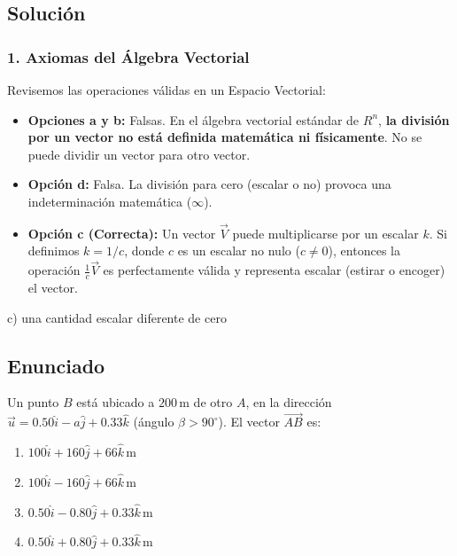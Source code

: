 \documentclass[12pt, a4paper]{article}
\begin{document}
\subsection*{Solución}

\subsubsection*{1. Axiomas del Álgebra Vectorial}
Revisemos las operaciones válidas en un Espacio Vectorial:
\begin{itemize}
    \item \textbf{Opciones a y b:} Falsas. En el álgebra vectorial estándar de $R^n$, \textbf{la división por un vector no está definida matemática ni físicamente}. No se puede dividir un vector para otro vector.
    \item \textbf{Opción d:} Falsa. La división para cero (escalar o no) provoca una indeterminación matemática ($\infty$).
    \item \textbf{Opción c (Correcta):} Un vector $\vec{V}$ puede multiplicarse por un escalar $k$. Si definimos $k = 1/c$, donde $c$ es un escalar no nulo ($c \neq 0$), entonces la operación $\frac{1}{c} \vec{V}$ es perfectamente válida y representa escalar (estirar o encoger) el vector.
\end{itemize}

\begin{tcolorbox}[colback=green!5!white, colframe=green!50!black, title=Respuesta Final]
\centering \Large c) una cantidad escalar diferente de cero
\end{tcolorbox}

\newpage


\subsection*{Enunciado}
Un punto $B$ está ubicado a $200 \, \text{m}$ de otro $A$, en la dirección $\vec{u} = 0.50 \hat{i} - a \hat{j} + 0.33 \hat{k}$ (ángulo $\beta > 90^\circ$). El vector $\vec{AB}$ es:
\begin{enumerate}[label=\alph*)]
    \item $100 \hat{i} + 160 \hat{j} + 66 \hat{k} \, \text{m}$
    \item $100 \hat{i} - 160 \hat{j} + 66 \hat{k} \, \text{m}$
    \item $0.50 \hat{i} - 0.80 \hat{j} + 0.33 \hat{k} \, \text{m}$
    \item $0.50 \hat{i} + 0.80 \hat{j} + 0.33 \hat{k} \, \text{m}$
\end{enumerate}
\end{document}
